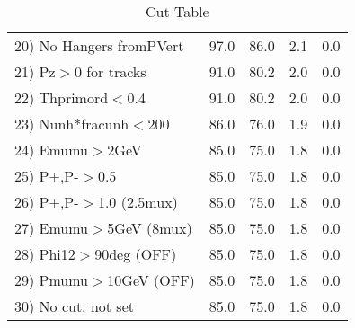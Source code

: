 \begin{table}[h!]
\begin{tabular}{||l||r|r|r|r||}
 20) No Hangers fromPVert &        97.0 &        86.0 &         2.1 &         0.0 \\
 21) Pz$>$0 for tracks    &        91.0 &        80.2 &         2.0 &         0.0 \\
 22) Thprimord$<$0.4      &        91.0 &        80.2 &         2.0 &         0.0 \\
 23) Nunh*fracunh$<$200   &        86.0 &        76.0 &         1.9 &         0.0 \\
 24) Emumu$>$2GeV         &        85.0 &        75.0 &         1.8 &         0.0 \\
 25) P+,P-$>$0.5          &        85.0 &        75.0 &         1.8 &         0.0 \\
 26) P+,P-$>$1.0 (2.5mux) &        85.0 &        75.0 &         1.8 &         0.0 \\
 27) Emumu$>$5GeV  (8mux) &        85.0 &        75.0 &         1.8 &         0.0 \\
 28) Phi12$>$90deg  (OFF) &        85.0 &        75.0 &         1.8 &         0.0 \\
 29) Pmumu$>$10GeV  (OFF) &        85.0 &        75.0 &         1.8 &         0.0 \\
 30) No cut, not set      &        85.0 &        75.0 &         1.8 &         0.0 \\
 \hline
 \hline
 \end{tabular}
 \caption{Cut Table \cohpip }
 \label{tab-cut_copip}
 \end{table}
